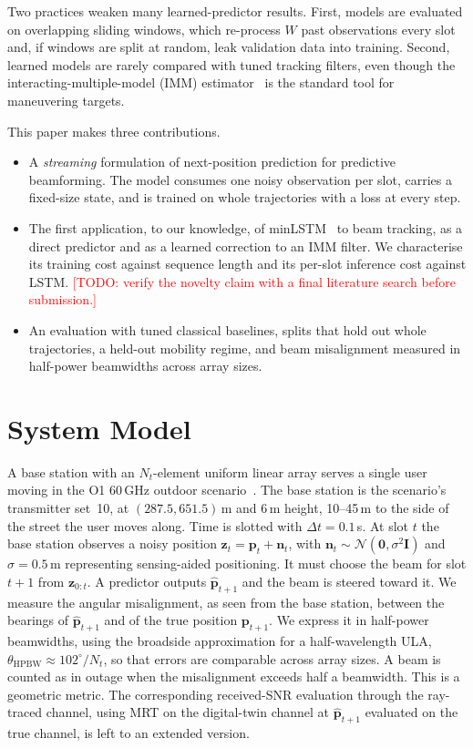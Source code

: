 \documentclass[conference]{IEEEtran}
\newcommand{\todo}[1]{\textcolor{red}{[TODO: #1]}}
\begin{document}
Two practices weaken many learned-predictor results. First, models are
evaluated on overlapping sliding windows, which re-process $W$ past
observations every slot and, if windows are split at random, leak validation
data into training. Second, learned models are rarely compared with tuned
tracking filters, even though the interacting-multiple-model (IMM)
estimator~\cite{blom1988imm} is the standard tool for maneuvering targets.

This paper makes three contributions.
\begin{itemize}
  \item A \emph{streaming} formulation of next-position prediction for
  predictive beamforming. The model consumes one noisy observation per slot,
  carries a fixed-size state, and is trained on whole trajectories with a loss
  at every step.
  \item The first application, to our knowledge, of minLSTM~\cite{feng2024minrnn}
  to beam tracking, as a direct predictor and as a learned correction to an
  IMM filter. We characterise its training cost against sequence length and
  its per-slot inference cost against LSTM. \todo{verify the novelty claim with
  a final literature search before submission.}
  \item An evaluation with tuned classical baselines, splits that hold out
  whole trajectories, a held-out mobility regime, and beam misalignment
  measured in half-power beamwidths across array sizes.
\end{itemize}

\section{System Model}

A base station with an $N_t$-element uniform linear array serves a single user
moving in the O1 60\,GHz outdoor scenario~\cite{alkhateeb2019deepmimo}. The
base station is the scenario's transmitter set~10, at $(287.5, 651.5)$\,m and
6\,m height, 10--45\,m to the side of the street the user moves along. Time is
slotted with $\Delta t = 0.1$\,s. At slot $t$ the base station observes a noisy
position $\mathbf{z}_t = \mathbf{p}_t + \mathbf{n}_t$, with
$\mathbf{n}_t \sim \mathcal{N}(\mathbf{0}, \sigma^2 \mathbf{I})$ and
$\sigma = 0.5$\,m representing sensing-aided positioning. It must choose the
beam for slot $t{+}1$ from $\mathbf{z}_{0:t}$. A predictor outputs
$\hat{\mathbf{p}}_{t+1}$ and the beam is steered toward it. We measure the
angular misalignment, as seen from the base station, between the bearings of
$\hat{\mathbf{p}}_{t+1}$ and of the true position $\mathbf{p}_{t+1}$. We
express it in half-power beamwidths, using the broadside approximation for a
half-wavelength ULA, $\theta_{\mathrm{HPBW}} \approx 102^\circ / N_t$, so that
errors are comparable across array sizes. A beam is counted as in outage when
the misalignment exceeds half a beamwidth. This is a geometric metric. The
corresponding received-SNR evaluation through the ray-traced channel, using
MRT on the digital-twin channel at $\hat{\mathbf{p}}_{t+1}$ evaluated on the
true channel, is left to an extended version.
\end{document}
